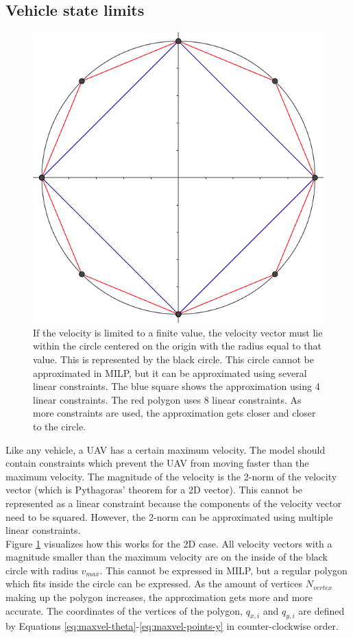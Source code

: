 \subsection{Vehicle state limits}
\label{subsec:state-limits}
\begin{figure}
    \centering
        \includegraphics[width=0.5\columnwidth]{img/circlelinear}
    \caption{If the velocity is limited to a finite value, the velocity vector must lie within the circle centered on the origin with the radius equal to that value. This is represented by the black circle. This circle cannot be approximated in MILP, but it can be approximated using several linear constraints. The blue square shows the approximation using 4 linear constraints. The red polygon uses 8 linear constraints. As more constraints are used, the approximation gets closer and closer to the circle. }\label{fig:circlelinear}
\end{figure}
Like any vehicle, a UAV has a certain maximum velocity. The model should contain constraints which prevent the UAV from moving faster than the maximum velocity. The magnitude of the velocity is the 2-norm of the velocity vector (which is Pythagoras' theorem for a 2D vector). This cannot be represented as a linear constraint because the components of the velocity vector need to be squared. However, the 2-norm can be approximated using multiple linear constraints. \\
Figure \ref{fig:circlelinear} visualizes how this works for the 2D case. All velocity vectors with a magnitude smaller than the maximum velocity are on the inside of the black circle with radius $v_{max}$. This cannot be expressed in MILP, but a regular polygon which fits inside the circle can be expressed. As the amount of vertices $N_{vertex}$ making up the polygon increases, the approximation gets more and more accurate. The coordinates of the vertices of the polygon, $q_{x,i}$ and $q_{y,i}$ are defined by Equations \ref{eq:maxvel-theta}-\ref{eq:maxvel-points-y} in counter-clockwise order.

